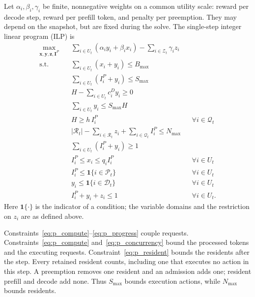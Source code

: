 \documentclass[11pt]{article}
\begin{document}
Let \(\alpha_i,\beta_i,\gamma_i\) be finite, nonnegative weights on a common utility scale: reward per decode step, reward per prefill token, and penalty per preemption. They may depend on the snapshot, but are fixed during the solve. The single-step integer linear program (ILP) is
\begin{subequations}
\label{eq:myopic_ilp}
\begin{align}
    \max_{\mathbf{x},\mathbf{y},\mathbf{z},\mathbf{I}^P}\quad
    &\sum_{i\in U_t}(\alpha_i y_i+\beta_i x_i)
      -\sum_{i\in\mathcal{Z}_t}\gamma_i z_i
    \label{eq:myopic_ilp_obj}\\
    \text{s.t.}\quad
    &\sum_{i\in U_t}(x_i+y_i)\le B_{\max}
    \label{eq:p_compute}\\
    &\sum_{i\in U_t}(I_i^P+y_i)\le S_{\max}
    \label{eq:p_concurrency}\\
    &H-\sum_{i\in U_t}c_i^D y_i\ge0
    \label{eq:p_memory}\\
    &\sum_{i\in U_t}y_i\le S_{\max}H
    \label{eq:p_decode_start}\\
    &H\ge h\,I_i^P
    &&\forall i\in\mathcal{Q}_t
    \label{eq:p_watermark}\\
    &|\mathcal{R}_t|-\sum_{i\in\mathcal{R}_t}z_i+\sum_{i\in\mathcal{Q}_t}I_i^P\le N_{\max}
    \label{eq:p_resident}\\
    &\sum_{i\in U_t}(I_i^P+y_i)\ge1
    \label{eq:p_progress}\\
    &I_i^P\le x_i\le q_i I_i^P
    &&\forall i\in U_t
    \label{eq:p_chunked}\\
    &I_i^P\le\mathbf{1}\{i\in\mathcal{P}_t\}
    &&\forall i\in U_t
    \label{eq:p_prefill_eligibility}\\
    &y_i\le\mathbf{1}\{i\in\mathcal{D}_t\}
    &&\forall i\in U_t
    \label{eq:p_causality}\\
    &I_i^P+y_i+z_i\le1
    &&\forall i\in U_t.
    \label{eq:p_mutex}
\end{align}
\end{subequations}
Here \(\mathbf{1}\{\cdot\}\) is the indicator of a condition; the variable domains and the restriction on \(z_i\) are as defined above.

Constraints~\ref{eq:p_compute}--\ref{eq:p_progress} couple requests. Constraints~\ref{eq:p_compute} and~\ref{eq:p_concurrency} bound the processed tokens and the executing requests. Constraint~\ref{eq:p_resident} bounds the residents after the step. Every retained resident counts, including one that executes no action in this step. A preemption removes one resident and an admission adds one; resident prefill and decode add none. Thus \(S_{\max}\) bounds execution actions, while \(N_{\max}\) bounds residents.
\end{document}
